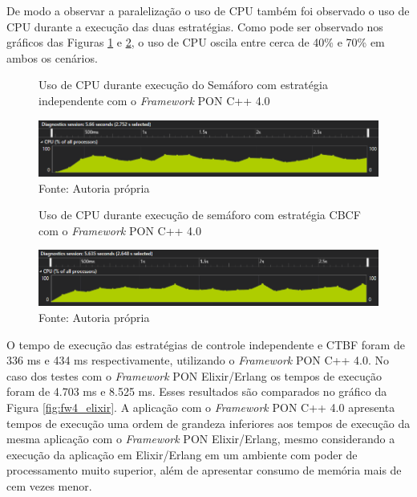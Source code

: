 De modo a observar a paralelização o uso de CPU também foi observado o uso de
CPU durante a execução das duas estratégias. Como pode ser observado nos
gráficos das Figuras \ref{fig:cpu_cta} e \ref{fig:cpu_cbcf}, o uso de CPU oscila
entre cerca de 40\% e 70\% em ambos os cenários.

\begin{figure}[!htb]
\centering
\caption{Uso de CPU durante execução do Semáforo com estratégia independente com
o \textit{Framework} PON C++ 4.0}
\smallskip
\includegraphics[width=\textwidth]{../figures/cta_cpu.png}
\caption*{Fonte: Autoria própria}
\label{fig:cpu_cta}
\end{figure}

\begin{figure}[!htb]
\centering
\caption{Uso de CPU durante execução de semáforo com estratégia CBCF com o
\textit{Framework} PON C++ 4.0}
\smallskip
\includegraphics[width=\textwidth]{../figures/cbcl_cpu.png}
\caption*{Fonte: Autoria própria}
\label{fig:cpu_cbcf}
\end{figure}
\FloatBarrier

O tempo de execução das estratégias de controle independente e CTBF foram de 336
ms e 434 ms respectivamente, utilizando o \textit{Framework} PON C++ 4.0. No
caso dos testes com o \textit{Framework} PON Elixir/Erlang os tempos de execução
foram de 4.703 ms e 8.525 ms. Esses resultados são comparados no gráfico da
Figura \ref{fig:fw4_elixir}. A aplicação com o \textit{Framework} PON C++ 4.0
apresenta tempos de execução uma ordem de grandeza inferiores aos tempos de
execução da mesma aplicação com o \textit{Framework} PON Elixir/Erlang, mesmo
considerando a execução da aplicação em Elixir/Erlang em um ambiente com poder
de processamento muito superior, além de apresentar consumo de memória mais de
cem vezes menor.

